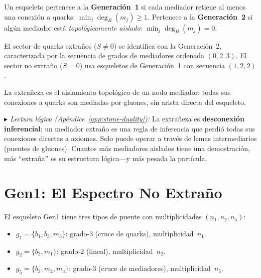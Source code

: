 \documentclass[11pt, a4paper, openany]{book}
\newcommand{\stoneref}[1]{%
  \smallskip\noindent
  {\small\color{structure!70}\textit{$\blacktriangleright$ Lectura
  l\'ogica (Ap\'endice~\ref{app:stone-duality}):} #1}%
  \smallskip}
\begin{document}
\begin{definition}
\label{def:quark-generations}
Un esqueleto pertenece a la \textbf{Generaci\'on~1} si cada mediador
retiene al menos una conexi\'on a quarks:
$\min_j \deg_B(m_j) \geq 1$.
Pertenece a la \textbf{Generaci\'on~2} si alg\'un mediador est\'a
\emph{topol\'ogicamente aislado}: $\min_j \deg_B(m_j) = 0$.
\end{definition}

\begin{theorem}
\label{thm:strangeness-isolation}
El sector de quarks extra\~nos ($S \neq 0$) se identifica con la
Generaci\'on~2, caracterizada por la secuencia de grados de
mediadores ordenada $(0, 2, 3)$.  El sector no extra\~no ($S = 0$)
usa esqueletos de Generaci\'on~1 con secuencia $(1, 2, 2)$.

La extra\~neza es el aislamiento topol\'ogico de un nodo mediador:
todas sus conexiones a quarks son mediadas por gluones, sin arista
directa del esqueleto.
\end{theorem}

\stoneref{La extra\~neza es \textbf{desconexi\'on inferencial}: un
mediador extra\~no es una regla de inferencia que perdi\'o todas
sus conexiones directas a axiomas.  Solo puede operar a trav\'es de
lemas intermediarios (puentes de gluones).  Cuantos m\'as mediadores
aislados tiene una demostraci\'on, m\'as ``extra\~na'' es su
estructura l\'ogica---y m\'as pesada la part\'icula.}

\section{Gen1: El Espectro No Extra\~no}
\label{sec:gen1-spectrum}

El esqueleto Gen1 tiene tres tipos de puente con multiplicidades
$(n_1, n_2, n_5)$:
\begin{itemize}
  \item $g_1 = \{b_1, b_3, m_3\}$: grado-3 (cruce de quarks),
    multiplicidad~$n_1$.
  \item $g_2 = \{b_2, m_1\}$: grado-2 (lineal),
    multiplicidad~$n_2$.
  \item $g_5 = \{b_3, m_2, m_3\}$: grado-3 (cruce de mediadores),
    multiplicidad~$n_5$.
\end{itemize}
\end{document}
